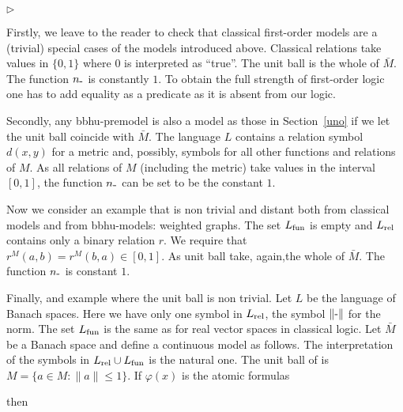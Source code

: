 \documentclass[12pt,letterpaper,oneside,reqno]{amsart}
\newcommand{\mylabel}[1]{{#1}\hfill}
\renewenvironment{itemize}
  {\begin{list}{$\triangleright$}{%
   \setlength{\parskip}{0mm}
   \setlength{\topsep}{.2\baselineskip}
   \setlength{\rightmargin}{0mm}
   \setlength{\listparindent}{0mm}
   \setlength{\itemindent}{0mm}
   \setlength{\labelwidth}{3ex}
   \setlength{\itemsep}{.2\baselineskip}
   \setlength{\parsep}{.2\baselineskip}
   \setlength{\partopsep}{0mm}
   \setlength{\labelsep}{1ex}
   \setlength{\leftmargin}{\labelwidth+\labelsep}
   \let\makelabel\mylabel}}{%
   \end{list}}
\theoremstyle{plain}
\theoremstyle{remark}
\begin{document}
\begin{itemize}
  \item [1.] Firstly, we leave to the reader to check that classical first-order models are a (trivial) special cases of the models introduced above.
        Classical relations take values in $\{0,1\}$ where $0$ is interpreted as ``true''.
        The unit ball is the whole of $\bar M$.
        The function $n_{\mbox-}$ is constantly $1$.
        To obtain the full strength of first-order logic one has to add equality as a predicate as it is absent from our logic.

  \item [2.] Secondly, any {\sc bbhu}-premodel is also a model as those in Section~\ref{uno} if we let the unit ball coincide with $\bar M$.
        The language $L$ contains a relation symbol $d(x,y)$ for a metric and, possibly, symbols for all other functions and relations of $M$.
        As all relations of $M$ (including the metric) take values in the interval $[0,1]$, the function $n_{\mbox-}$ can be set to be the constant $1$.

  \item [3.] Now we consider an example that is non trivial and distant both from classical models and from {\sc bbhu}-models: weighted graphs.
        The set $L_{\rm fun}$ is empty and $L_{\rm rel}$ contains only a binary relation $r$.
        We require that $r^M(a,b)=r^M(b,a)\in[0,1]$.
        As unit ball take, again,the whole of $\bar M$.
        The function $n_{\mbox-}$ is constant $1$.


  \item [4.] Finally, and example where the unit ball is non trivial.
        Let $L$ be the language of Banach spaces.
        Here we have only one symbol in $L_{\rm rel}$, the symbol $\|\mbox-\|$ for the norm.
        The set $L_{\rm fun}$ is the same as for real vector spaces in classical logic.
        Let $\bar M$ be a Banach space and define a continuous model as follows.
        The interpretation of the symbols in $L_{\rm rel}\cup L_{\rm fun}$ is the natural one.
        The unit ball of is $M=\{a\in M: \|a\|\le1\}$.
        If $\varphi(x)$ is the atomic formulas


        then



\end{itemize}
\end{document}
